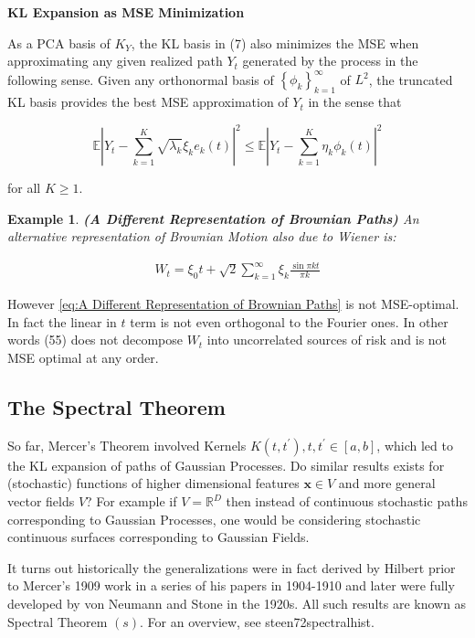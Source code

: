\documentclass[11pt]{article}
\theoremstyle{plain} %
\newtheorem{example}[theorem]{Example}
\theoremstyle{remark}
\begin{document}
\textbf{KL Expansion as MSE Minimization}

As a PCA basis of $K_{Y}$, the KL basis in (7) also minimizes the MSE when
approximating any given realized path $Y_{t}$ generated by the process in the
following sense. Given any orthonormal basis of
$\left\{\phi_{k}\right\}_{k=1}^{\infty}$ of $L^{2}$, the truncated KL basis
provides the best MSE approximation of $Y_{t}$ in the sense that

$$
  \mathbb{E}\left|Y_{t}-\sum_{k=1}^{K} \sqrt{\lambda_{k}} \xi_{k} e_{k}(t)\right|^{2} \leq \mathbb{E}\left|Y_{t}-\sum_{k=1}^{K} \eta_{k} \phi_{k}(t)\right|^{2}
$$

for all $K \geq 1$.

\begin{example}\textbf{(A Different Representation of Brownian Paths)}
  An alternative representation of Brownian Motion also due to Wiener is:

\begin{align}
  W_{t}=\xi_{0} t+\sqrt{2} \sum_{k=1}^{\infty} \xi_{k} \frac{\sin \pi k t}{\pi k}
  \label{eq:A Different Representation of Brownian Paths}
\end{align}
\end{example}


However \cref{eq:A Different Representation of Brownian Paths} is not MSE-optimal. In fact the linear in $t$ term is not even
orthogonal to the Fourier ones. In other words (55) does not decompose $W_{t}$
into uncorrelated sources of risk and is not MSE optimal at any order.

\subsection{The Spectral Theorem}
So far, Mercer's Theorem involved Kernels $K\left(t, t^{\prime}\right), t,
  t^{\prime} \in[a, b]$, which led to the KL expansion of paths of Gaussian
Processes. Do similar results exists for (stochastic) functions of higher
dimensional features $\mathbf{x} \in V$ and more general vector fields $V$? For
example if $V=\mathbb{R}^{D}$ then instead of continuous stochastic paths
corresponding to Gaussian Processes, one would be considering stochastic
continuous surfaces corresponding to Gaussian Fields.

It turns out historically the generalizations were in fact derived by Hilbert
prior to Mercer's 1909 work in a series of his papers in 1904-1910 and later
were fully developed by von Neumann and Stone in the 1920s. All such results are
known as Spectral Theorem $(s)$. For an overview, see steen72spectralhist.
\end{document}
